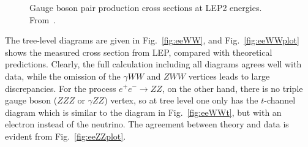 \documentclass[12pt]{report}
\newcommand{\2}{\ensuremath{\sqrt{2}\,}}
\begin{document}
{\begin{itemize}
          \begin{figure}[b]
            \begin{center}
              \hspace{.02\textwidth}
            \end{center}
            \vspace{-.7cm}
            \caption{\label{fig:pairproduction}Gauge boson pair production cross sections at LEP2
              energies. From~\cite{ewwg}.}
          \end{figure}

          The tree-level diagrams are given in
          Fig.~\ref{fig:eeWW}, and Fig.~\ref{fig:eeWWplot} shows the measured cross section from
          LEP, compared with theoretical predictions. Clearly, the full calculation including all
          diagrams agrees well with data, while the omission of the $\gamma WW$ and $ZWW$
          vertices leads to large discrepancies.  For the process \mbox{$e^+ e^-\to ZZ$}, on the other hand,
          there is no triple gauge boson ($ZZZ$ or $\gamma ZZ$) vertex, so at tree level
          one only has the $t$-channel diagram which is similar to the diagram in
          Fig.~\ref{fig:eeWWt}, but with an electron instead of the neutrino. The agreement
          between theory and data is evident from Fig.~\ref{fig:eeZZplot}. 
        \end{itemize}



}
\end{document}
